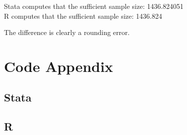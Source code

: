 \documentclass[12pt]{article}
\begin{document}
\subsubsection{}

  Stata computes that the sufficient sample size: 1436.824051\\
  R computes that the sufficient sample size:  1436.824

  The difference is clearly a rounding error.

\begin{center}
\end{center}


\begin{center}


\end{center}

\section{Code Appendix}
\subsection*{Stata}

\subsection*{R}

\end{document}
